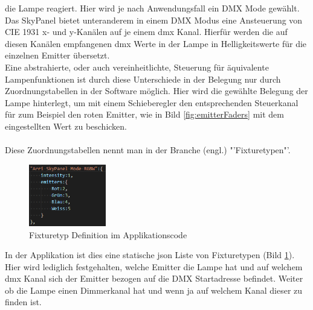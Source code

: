 \documentclass[11pt]{scrartcl}
\begin{document}
die Lampe reagiert. Hier wird je nach Anwendungsfall ein DMX Mode gewählt. Das SkyPanel bietet unteranderem in einem DMX Modus eine Ansteuerung von CIE 1931 x- und
y-Kanälen auf je einem \ac{dmx} Kanal. Hierfür werden die auf diesen Kanälen empfangenen \ac{dmx} Werte in der Lampe in Helligkeitswerte für die einzelnen Emitter
übersetzt.\\
Eine abstrahierte, oder auch vereinheitlichte, Steuerung für äquivalente Lampenfunktionen ist durch diese Unterschiede in der Belegung nur durch
Zuordnungstabellen in der Software möglich. Hier wird die gewählte Belegung der Lampe hinterlegt, um mit einem Schieberegler den entsprechenden Steuerkanal für
zum Beispiel den roten Emitter, wie in Bild \ref{fig:emitterFaders} mit dem eingestellten Wert zu beschicken.\\
\\
Diese Zuordnungstabellen nennt man in der Branche (engl.) "'Fixturetypen"'.
\clearpage
\begin{figure}
    \vspace{-25pt}
    \begin{center}
        \includegraphics[width=0.3\textwidth]{images/code_fixturetype_skypanel.png}
    \end{center}
    \vspace{-20pt}
    \caption{Fixturetyp Definition im Applikationscode} \label{fig:code_fixturetype}
    \vspace{-15pt}
\end{figure}
\noindent
In der Applikation ist dies eine statische \ac{json} Liste von Fixturetypen (Bild \ref{fig:code_fixturetype}). Hier wird lediglich festgehalten, welche
Emitter die Lampe hat und auf welchem \ac{dmx} Kanal sich der Emitter bezogen auf die DMX Startadresse befindet. Weiter ob die Lampe einen Dimmerkanal hat und
wenn ja auf welchem Kanal dieser zu finden ist.\\
\end{document}
